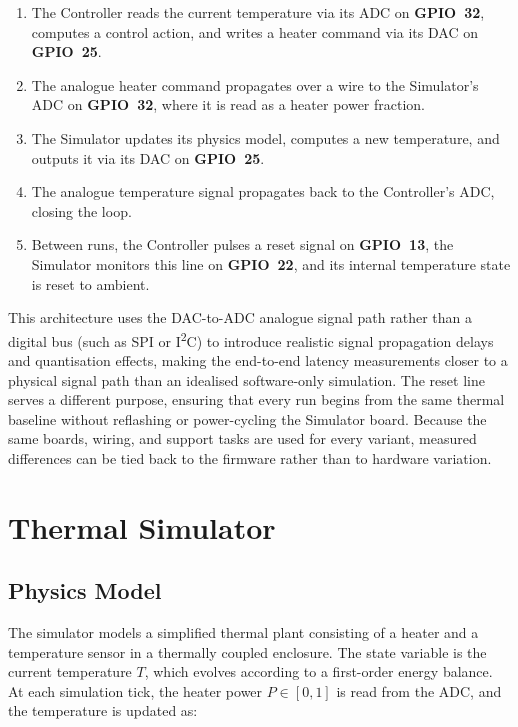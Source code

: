 \documentclass[12pt, a4paper]{report}
\begin{document}
\begin{enumerate}
    \item The Controller reads the current temperature via its ADC on \textbf{GPIO~32}, computes a
    control action, and writes a heater command via its DAC on \textbf{GPIO~25}.
    \item The analogue heater command propagates over a wire to the Simulator's ADC
    on \textbf{GPIO~32}, where it is read as a heater power fraction.
    \item The Simulator updates its physics model, computes a new temperature, and outputs
    it via its DAC on \textbf{GPIO~25}.
    \item The analogue temperature signal propagates back to the Controller's ADC, closing 
    the loop.
    \item Between runs, the Controller pulses a reset signal on \textbf{GPIO~13}, the Simulator monitors this line on \textbf{GPIO~22}, and its internal temperature state is reset to ambient.
\end{enumerate}

This architecture uses the DAC-to-ADC analogue signal path rather than a digital bus (such
as SPI or I\textsuperscript{2}C) to introduce realistic signal propagation delays and
quantisation effects, making the end-to-end latency measurements closer to a physical
signal path than an idealised software-only simulation. The reset line serves a different purpose, ensuring that every run begins from the same thermal baseline without reflashing or power-cycling the Simulator board. Because the same boards, wiring, and support tasks are used for every variant, measured differences can be tied back to the firmware rather than to hardware variation.



\section{Thermal Simulator}
\label{sec:simulator}

\subsection{Physics Model}
\label{subsec:physics}

The simulator models a simplified thermal plant consisting of a heater and a temperature sensor in a thermally coupled enclosure. The state variable is the current temperature $T$, which evolves according to a first-order energy balance. At each simulation tick, the heater power $P \in [0, 1]$ is read from the ADC, and the temperature is updated as:
\end{document}
